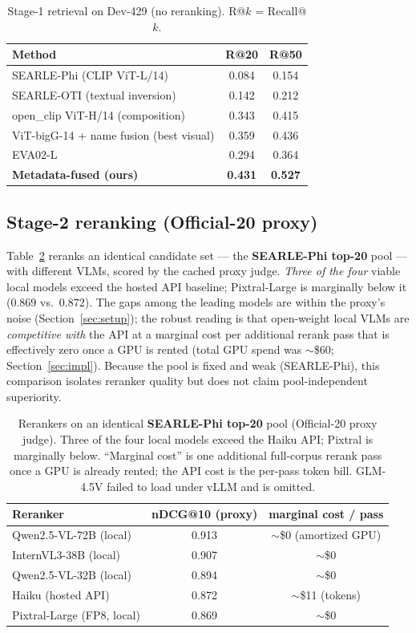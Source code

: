 \documentclass[sigconf,nonacm]{acmart}
\begin{document}
\begin{table}[t]
\centering\small
\caption{Stage-1 retrieval on Dev-429 (no reranking). R@$k$ = Recall@$k$.}
\label{tab:stage1}
\begin{tabular}{@{}lcc@{}}
\toprule
Method & R@20 & R@50 \\
\midrule
SEARLE-Phi (CLIP ViT-L/14) & 0.084 & 0.154 \\
SEARLE-OTI (textual inversion) & 0.142 & 0.212 \\
open\_clip ViT-H/14 (composition) & 0.343 & 0.415 \\
ViT-bigG-14 + name fusion (best visual) & 0.359 & 0.436 \\
EVA02-L & 0.294 & 0.364 \\
\textbf{Metadata-fused (ours)} & \textbf{0.431} & \textbf{0.527} \\
\bottomrule
\end{tabular}
\end{table}

\subsection{Stage-2 reranking (Official-20 proxy)}
Table~\ref{tab:rerank} reranks an identical candidate set --- the
\textbf{SEARLE-Phi top-20} pool --- with different VLMs, scored by the cached
proxy judge. \emph{Three of the four} viable local models exceed the hosted
API baseline; Pixtral-Large is marginally below it ($0.869$ vs.\ $0.872$).
The gaps among the leading models are within the proxy's noise
(Section~\ref{sec:setup}); the robust reading is that open-weight local VLMs
are \emph{competitive with} the API at a marginal cost per additional rerank
pass that is effectively zero once a GPU is rented (total GPU spend was
$\sim$\$60; Section~\ref{sec:impl}). Because the pool is fixed and weak
(SEARLE-Phi), this comparison isolates reranker quality but does not claim
pool-independent superiority.

\begin{table}[t]
\centering\small
\caption{Rerankers on an identical \textbf{SEARLE-Phi top-20} pool
(Official-20 proxy judge). Three of the four local models exceed the Haiku
API; Pixtral is marginally below. ``Marginal cost'' is one additional
full-corpus rerank pass once a GPU is already rented; the API cost is the
per-pass token bill. GLM-4.5V failed to load under vLLM and is omitted.}
\label{tab:rerank}
\begin{tabular}{@{}lcc@{}}
\toprule
Reranker & nDCG@10 (proxy) & marginal cost / pass \\
\midrule
Qwen2.5-VL-72B (local) & 0.913 & $\sim$\$0 (amortized GPU) \\
InternVL3-38B (local) & 0.907 & $\sim$\$0 \\
Qwen2.5-VL-32B (local) & 0.894 & $\sim$\$0 \\
Haiku (hosted API) & 0.872 & $\sim$\$11 (tokens) \\
Pixtral-Large (FP8, local) & 0.869 & $\sim$\$0 \\
\bottomrule
\end{tabular}
\end{table}
\end{document}
